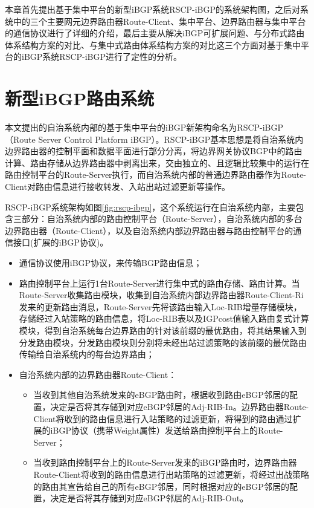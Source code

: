 本章首先提出基于集中平台的新型iBGP系统RSCP-iBGP的系统架构图，之后对系统中的三个主要网元边界路由器Route-Client、集中平台、边界路由器与集中平台的通信协议进行了详细的介绍，最后主要从解决iBGP可扩展问题、与分布式路由体系结构方案的对比、与集中式路由体系结构方案的对比这三个方面对基于集中平台的iBGP系统RSCP-iBGP进行了定性的分析。

\section{新型iBGP路由系统}
本文提出的自治系统内部的基于集中平台的iBGP新架构命名为RSCP-iBGP（Route Server Control Platform iBGP）。RSCP-iBGP基本思想是将自治系统内边界路由器的控制平面和数据平面进行部分分离，将边界网关协议BGP中的路由计算、路由存储从边界路由器中剥离出来，交由独立的、且逻辑比较集中的运行在路由控制平台的Route-Server执行，而自治系统内部的普通边界路由器作为Route-Client对路由信息进行接收转发、入站出站过滤更新等操作。

RSCP-iBGP系统架构如图\ref{fig:rscp-ibgp}，这个系统运行在自治系统内部，主要包含三部分：自治系统内部的路由控制平台（Route-Server），自治系统内部的多台边界路由器（Route-Client），以及自治系统内部边界路由器与路由控制平台的通信接口(扩展的iBGP协议)。
\begin{itemize}
  \item 通信协议使用iBGP协议，来传输BGP路由信息；
  \item 路由控制平台上运行1台Route-Server进行集中式的路由存储、路由计算。当Route-Server收集路由模块，收集到自治系统内部边界路由器Route-Client-Ri发来的更新路由消息，Route-Server先将该路由输入Loc-RIB增量存储模块，存储经过入站策略的路由信息，将Loc-RIB表以及IGPcost值输入路由复式计算模块，得到自治系统每台边界路由的针对该前缀的最优路由，将其结果输入到分发路由模块，分发路由模块则分别将未经出站过滤策略的该前缀的最优路由传输给自治系统内的每台边界路由；
  \item 自治系统内部的边界路由器Route-Client：
        \begin{itemize}
          \item 当收到其他自治系统发来的eBGP路由时，根据收到路由eBGP邻居的配置，决定是否将其存储到对应eBGP邻居的Adj-RIB-In。边界路由器Route-Client将收到的路由信息进行入站策略的过滤更新，将得到的路由通过扩展的iBGP协议（携带Weight属性）发送给路由控制平台上的Route-Server；
          \item 当收到路由控制平台上的Route-Server发来的iBGP路由时，边界路由器Route-Client将收到的路由信息进行出站策略的过滤更新，将经过出战策略的路由其宣告给自己的所有eBGP邻居，同时根据对应的eBGP邻居的配置，决定是否将其存储到对应eBGP邻居的Adj-RIB-Out。
        \end{itemize}
\end{itemize}

